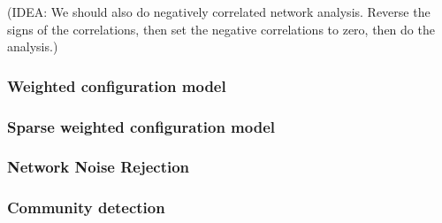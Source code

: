 \documentclass[a4paper,12pt]{article}
\theoremstyle{definition}
\begin{document}
        (IDEA: We should also do negatively correlated network analysis. Reverse the signs of the correlations, then set the negative correlations to zero, then do the analysis.)

        \subsubsection{Weighted configuration model}

        \subsubsection{Sparse weighted configuration model}

        \subsubsection{Network Noise Rejection}
        

        \subsubsection{Community detection}



\newpage

\end{document}
